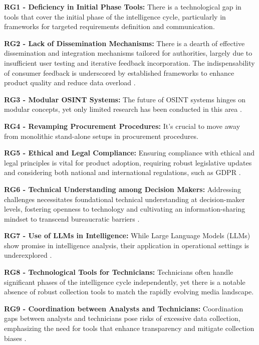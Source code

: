 \documentclass[10pt]{article}
\begin{document}
\textbf{RG1 - Deficiency in Initial Phase Tools:} There is a technological gap in tools that cover the initial phase of the intelligence cycle, particularly in frameworks for targeted requirements definition and communication.

\textbf{RG2 - Lack of Dissemination Mechanisms:} There is a dearth of effective dissemination and integration mechanisms tailored for authorities, largely due to insufficient user testing and iterative feedback incorporation. The indispensability of consumer feedback is underscored by established frameworks to enhance product quality and reduce data overload \cite{DirectorofNationalIntelligence.2011,JointChiefsofStaffU.S.Army.2013,NorthAtlanticTreatyOrganization.2001,Gibson.2016,Day.2016}.

\textbf{RG3 - Modular OSINT Systems:} The future of OSINT systems hinges on modular concepts, yet only limited research has been conducted in this area \cite{Arjun.2020,Wright.2020}.

\textbf{RG4 - Revamping Procurement Procedures:} It's crucial to move away from monolithic stand-alone setups in procurement procedures.

\textbf{RG5 - Ethical and Legal Compliance:} Ensuring compliance with ethical and legal principles is vital for product adoption, requiring robust legislative updates and considering both national and international regulations, such as GDPR \cite{EuropeanParliament.2016,EuropeanCommission.18.08.2023,Ghioni.2023}.

\textbf{RG6 - Technical Understanding among Decision Makers:} Addressing challenges necessitates foundational technical understanding at decision-maker levels, fostering openness to technology and cultivating an information-sharing mindset to transcend bureaucratic barriers \cite{NorthAtlanticTreatyOrganization.2001}.

\textbf{RG7 - Use of LLMs in Intelligence:} While Large Language Models (LLMs) show promise in intelligence analysis, their application in operational settings is underexplored \cite{Radford.2023,Zhao.31.03.2023}.

\textbf{RG8 - Technological Tools for Technicians:} Technicians often handle significant phases of the intelligence cycle independently, yet there is a notable absence of robust collection tools to match the rapidly evolving media landscape.

\textbf{RG9 - Coordination between Analysts and Technicians:} Coordination gaps between analysts and technicians pose risks of excessive data collection, emphasizing the need for tools that enhance transparency and mitigate collection biases \cite{Lowenthal.2020}.
\end{document}
